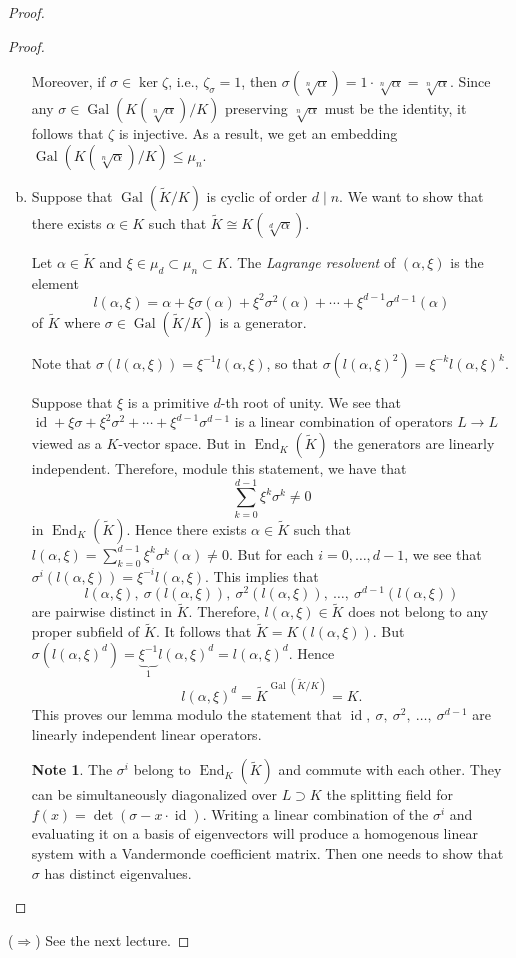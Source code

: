 \documentclass[10pt,letterpaper,cm]{nupset}
\theoremstyle{definition}
\newtheorem{note}{Note}
\newcommand{\1}{\mathbf{1}}
\newcommand{\0}{\vec 0}
\DeclareMathOperator{\id}{id}
\DeclareMathOperator{\gal}{Gal}
\DeclareMathOperator{\ed}{End}
\begin{document}
\begin{proof}
\begin{proof}
\begin{enumerate}[(a)]
 Moreover, if $\sigma \in \ker{\zeta}$, i.e., $\zeta_{\sigma} = 1$, then $\sigma(\sqrt[n]{\alpha}) = 1 \cdot \sqrt[n]{\alpha} = \sqrt[n]{\alpha}$. Since any $\sigma \in \gal(K(\sqrt[n]{\alpha})/K)$ preserving $\sqrt[n]{\alpha}$ must be the identity, it follows that $\zeta$ is injective. As a result, we get an embedding $\gal(K(\sqrt[n]{\alpha})/K) \leq \mu_n$.
 
\item Suppose that $\gal(\widetilde{K}/K)$ is cyclic of order $d \mid n$. We want to show that there exists $\alpha \in K$ such that $\widetilde{K} \cong K(\sqrt[d]{\alpha})$. 

Let $ \alpha \in \widetilde{K}$ and $\xi \in \mu_d \subset \mu_n \subset K$. The \textit{Lagrange resolvent} of $(\alpha, \xi)$ is the element $$ l(\alpha, \xi) =    \alpha + \xi \sigma(\alpha) + \xi^2 \sigma^2(\alpha) + \cdots + \xi^{d-1} \sigma^{d-1}(\alpha)$$ of $\widetilde{K}$ where $\sigma \in \gal(\widetilde{K}/K)$ is a generator. 

Note that $\sigma(l(\alpha, \xi)) = \xi^{-1}l(\alpha, \xi)$, so that $\sigma(l(\alpha, \xi)^2) = \xi^{-k}l(\alpha, \xi)^k$.

Suppose that $\xi$ is a primitive $d$-th root of unity.  We see that $\id + \xi \sigma + \xi^2 \sigma^2 + \cdots + \xi^{d-1} \sigma^{d-1}$ is a linear combination of operators $L \to L$ viewed as a $K$-vector space. But in $\ed_K(\widetilde{K})$ the generators are linearly independent. Therefore, module this statement, we have that $$ \sum_{k=0}^{d-1} \xi^k \sigma^k  \ne 0 $$ in $\ed_K(\widetilde{K})$. Hence there exists $\alpha \in \widetilde{K}$ such that $l(\alpha, \xi) = \sum_{k=0}^{d-1} \xi^k \sigma^k(\alpha) \ne 0$. But for each $i=0, \ldots, d-1$, we see that $\sigma^i(l(\alpha, \xi)) = \xi^{-i}l(\alpha, \xi)$. This implies that $$l(\alpha, \xi), \ \sigma(l(\alpha, \xi)), \ \sigma^2(l(\alpha, \xi)), \ \ldots, \ \sigma^{d-1}(l(\alpha, \xi))$$ are pairwise distinct in $\widetilde{K}$. Therefore, $l(\alpha, \xi) \in \widetilde{K}$ does not belong to any proper subfield of $\widetilde{K}$. It follows that $\widetilde{K} = K(l(\alpha, \xi))$. But $\sigma(l(\alpha, \xi)^d) = \underbrace{\xi^{-1}}_{1}l(\alpha, \xi)^d = l(\alpha, \xi)^d.$ Hence $$l(\alpha, \xi)^d = \widetilde{K}^{\gal(\widetilde{K}/K)} = K.$$This proves our lemma modulo the statement that $\id, \ \sigma, \  \sigma^2, \ \ldots , \ \sigma^{d-1}$ are linearly independent linear operators.
\begin{note}
The $\sigma^i$ belong to $\ed_K(\widetilde{K})$ and commute with each other. They can be simultaneously diagonalized over $L \supset K$ the splitting field for $f(x) = \det(\sigma - x \cdot \id)$. Writing a linear combination of the $\sigma^i$ and evaluating it on a basis of eigenvectors will produce a homogenous linear system with a Vandermonde coefficient matrix. Then one needs to show that $\sigma$ has distinct eigenvalues. 
\end{note}
\end{enumerate}
\end{proof}
($\Longrightarrow$) See the next lecture.
\end{proof}
\end{document}
